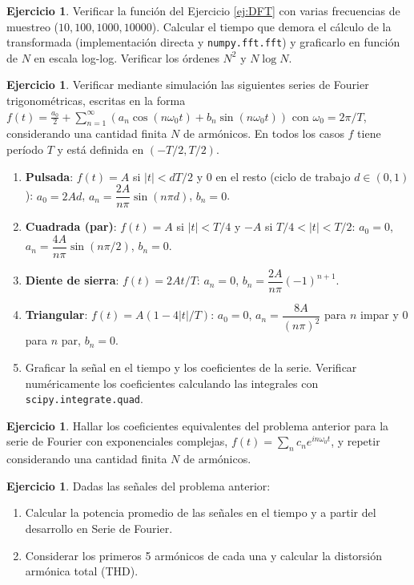 \documentclass[12pt, a4paper]{amsbook}
\theoremstyle{remark}
\theoremstyle{definition}
\newtheorem{ejer}[teo]{Ejercicio}
\numberwithin{section}{chapter}
\numberwithin{subsection}{section}
\numberwithin{equation}{section}
\numberwithin{figure}{chapter}
\begin{document}
\begin{ejer} Verificar la función del Ejercicio \ref{ej:DFT} con varias frecuencias de muestreo ($10,100,1000,10000$). Calcular el tiempo que demora el cálculo de la transformada (implementación directa y \lstinline{numpy.fft.fft}) y graficarlo en función de $N$ en escala log-log. Verificar los órdenes $N^2$ y $N\log N$.
\end{ejer}

\begin{ejer}\label{series-sin-cos}
Verificar mediante simulación las siguientes series de Fourier trigonométricas, escritas en la forma $f(t) = \frac{a_0}{2} + \sum_{n=1}^{\infty} \left(a_n \cos(n\omega_0 t) + b_n \sin(n\omega_0 t)\right)$ con $\omega_0 = 2\pi/T$, considerando una cantidad finita $N$ de armónicos. En todos los casos $f$ tiene período $T$ y está definida en $(-T/2,T/2)$.
\begin{enumerate}
    \item \textbf{Pulsada}: $f(t)=A$ si $|t|<dT/2$ y $0$ en el resto (ciclo de trabajo $d\in(0,1)$): $a_0=2Ad$, $a_n=\dfrac{2A}{n\pi}\sin(n \pi d)$, $b_n=0$.
    \item \textbf{Cuadrada (par)}: $f(t)=A$ si $|t|<T/4$ y $-A$ si $T/4<|t|<T/2$: $a_0=0$, $a_n=\dfrac{4A}{n\pi}\sin(n \pi/2)$, $b_n=0$.
    \item \textbf{Diente de sierra}: $f(t)=2At/T$: $a_n=0$, $b_n=\dfrac{2A}{n\pi}(-1)^{n+1}$.
    \item \textbf{Triangular}: $f(t)=A(1-4|t|/T)$: $a_0=0$, $a_n=\dfrac{8A}{(n\pi)^2}$ para $n$ impar y $0$ para $n$ par, $b_n=0$.
    \item Graficar la señal en el tiempo y los coeficientes de la serie. Verificar numéricamente los coeficientes calculando las integrales con \lstinline{scipy.integrate.quad}.
\end{enumerate}
\end{ejer}

\begin{ejer}\label{series-exp}
Hallar los coeficientes equivalentes del problema anterior para la serie de Fourier con exponenciales complejas, $f(t) = \sum_n c_n e^{i n\omega_0 t}$, y repetir considerando una cantidad finita $N$ de armónicos.
\end{ejer}

\begin{ejer}\label{parseval}
Dadas las señales del problema anterior:
\begin{enumerate}
\item Calcular la potencia promedio de las señales en el tiempo y a partir del desarrollo en Serie de Fourier.
\item Considerar los primeros 5 armónicos de cada una y calcular la distorsión armónica total (THD).
\end{enumerate}
\end{ejer}
\end{document}

